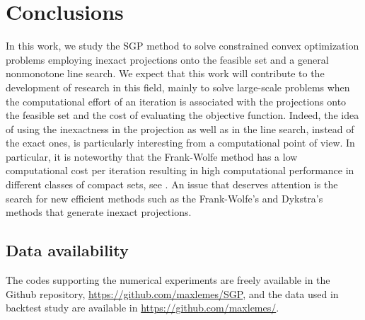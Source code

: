 

\chapter{Conclusions} \label{chap:Conclusions}
\thispagestyle{empty}

In this work, we study the SGP method  to solve   constrained convex optimization problems employing  inexact projections onto the feasible set and a general nonmonotone  line search. We expect that this work will contribute to the development of research in this field, mainly to solve large-scale problems when the computational effort of an iteration is associated with the projections onto the feasible set and  the cost of evaluating the objective function. Indeed, the idea of using the inexactness in the projection as well as in the line search,   instead of the exact ones, is particularly interesting from a computational point of view. In particular,   it is noteworthy that the Frank-Wolfe method  has a low computational cost per iteration  resulting in high computational performance in different classes of compact sets, see \cite{GarberHazan2015, Jaggi2013}.  An issue that deserves attention is the search for new efficient methods such as the Frank-Wolfe's and Dykstra's  methods that generate inexact projections.


\section*{Data availability} 
The codes supporting the numerical experiments are freely available in the Github repository, \url{https://github.com/maxlemes/SGP}, and the data used in backtest study are available in \url{https://github.com/maxlemes/}.